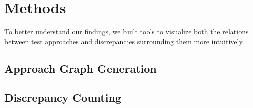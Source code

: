 \section{Methods}
\label{methods}

To better understand our findings, we built tools to visualize both the
relations between test approaches and discrepancies surrounding them more
intuitively.

\subsection{Approach Graph Generation}

\graphGenDesc{}

\subsection{Discrepancy Counting}

